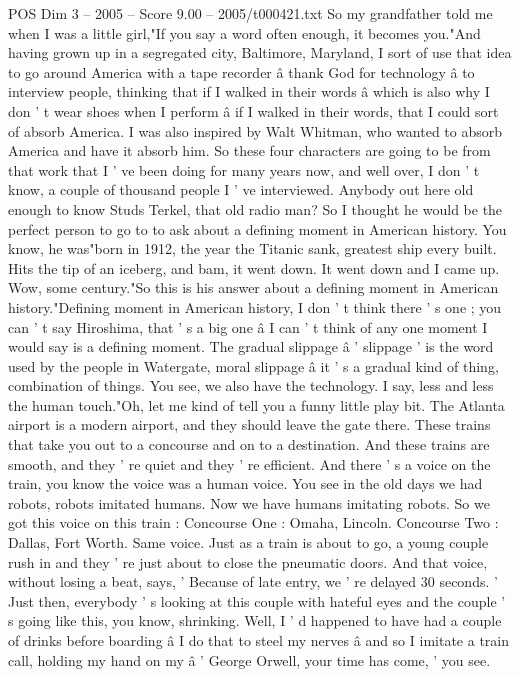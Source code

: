 \begin{textsample}{POS Dim 3 – 2005 – Score 9.00 – 2005/t000421.txt}  \label{ex:f3_pos_049}
So my grandfather told me when I was a little girl,"If you say a word often enough, it becomes you."And having grown up in a segregated city, Baltimore, Maryland, I sort of use that idea to go around America with a tape recorder â thank God for technology â to interview people, thinking that if I walked in their words â which is also why I don ' t wear shoes when I perform â if I walked in their words, that I could sort of absorb America.
I was also inspired by Walt Whitman, who wanted to absorb America and have it absorb him.
So these four characters are going to be from that work that I ' ve been doing for many years now, and well over, I don ' t know, a couple of thousand people I ' ve interviewed.
Anybody out here old enough to know Studs Terkel, that old radio man?
So I thought he would be the perfect person to go to to ask about a defining moment in American history.
You know, he was"born in 1912, the year the Titanic sank, greatest ship every built.
Hits the tip of an iceberg, and bam, it went down.
It went down and I came up.
Wow, some century."So this is his answer about a defining moment in American history."Defining moment in American history, I don ' t think there ' s one ; you can ' t say Hiroshima, that ' s a big one â I can ' t think of any one moment I would say is a defining moment.
The gradual slippage â ' slippage ' is the word used by the people in Watergate, moral slippage â it ' s a gradual kind of thing, combination of things.
You see, we also have the technology.
I say, less and less the human touch."Oh, let me kind of tell you a funny little play bit.
The Atlanta airport is a modern airport, and they should leave the gate there.
These trains that take you out to a concourse and on to a destination.
And these trains are smooth, and they ' re quiet and they ' re efficient.
And there ' s a voice on the train, you know the voice was a human voice.
You see in the old days we had robots, robots imitated humans.
Now we have humans imitating robots.
So we got this voice on this train : Concourse One : Omaha, Lincoln.
Concourse Two : Dallas, Fort Worth.
Same voice.
Just as a train is about to go, a young couple rush in and they ' re just about to close the pneumatic doors.
And that voice, without losing a beat, says, ' Because of late entry, we ' re delayed 30 seconds. ' Just then, everybody ' s looking at this couple with hateful eyes and the couple ' s going like this, you know, shrinking.
Well, I ' d happened to have had a couple of drinks before boarding â I do that to steel my nerves â and so I imitate a train call, holding my hand on my â ' George Orwell, your time has come, ' you see.

\end{textsample}
